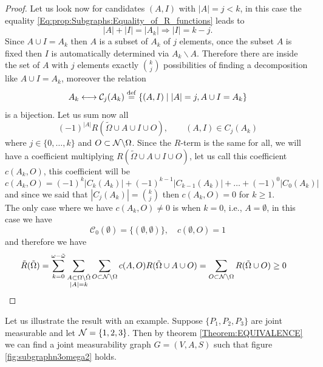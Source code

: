 \documentclass[10pt, a4paper]{amsart}
\begin{document}
\begin{proof}
Let us look now for candidates $(A,I)$ with $|A| = j< k$, in this case the equality \ref{Eq:prop:Subgraphs:Equality_of_R_functions} leads to 
$$
|A| + |I| = |A_{k}| \Rightarrow |I | = k-j.
$$ 
Since $A \cup I = A_{k}$ then $A$ is a subset of $A_{k}$ of $j$ elements, once the subset $A$ is fixed then $I$ is automatically determined via $A_{k}\backslash A $. Therefore there are inside the set of $A$ with $j$ elements exactly $\binom{k}{j}$ possibilities of finding a decomposition like $A\cup I = A_{k}$, moreover the relation 
$$
A_{k}\longleftrightarrow \mathcal{C}_{j}(A_{k})\overset{\mathrm{def}}{=} \{ (A,I) \mid |A|= j, A\cup I = A_{k}  \}
$$
is a bijection. Let us sum now all 
$$(-1)^{|A|}
R(
\tilde{\Omega}
\cup A\cup I \cup O
 ), \qquad (A,I) \in C_{j}(A_{k})
 $$
 where $ j\in \{0, \ldots, k\} $ and $ O \subset \mathcal{N}\backslash \Omega $. Since the $R$-term is the same for all, we will have a coefficient multiplying $R(
\tilde{\Omega}
\cup A\cup I \cup O
 )$, let us call this coefficient $c(A_{k},O)$, this coefficient will be 
 $$
c(A_{k},O ) = (-1)^{k}|C_{k}(A_{k})| + (-1)^{k-1} |C_{k-1}(A_{k})|+ \ldots + (-1)^{0}|C_{0}(A_{k})|
 $$ 
 and since we said that $|C_{j}(A_{k}) | = \binom{k}{j}$ then $c(A_{k},O) = 0$ for $k\geq 1$. \\
 
 The only case where we have $c(A_{k}, O) \neq 0$ is when $k=0$, i.e., $A = \emptyset$, in this case we have 
 $$
\mathcal{C}_{0}(\emptyset) =  \{(\emptyset,\emptyset) \}, \quad c(\emptyset,O ) =1
 $$
 and therefore we have 
 \begin{align*}
 \tilde{R}(\tilde{\Omega})
 &=
 \sum_{k=0}^{\omega - \tilde{\omega}}
 \sum_{\substack{
A\subset \Omega\backslash \tilde{\Omega}\\
|A| = k 
 }}
 \sum_{O\subset \mathcal{N}\backslash \Omega}
 c(A,O)
 R(\tilde{\Omega}\cup A \cup O)
 = 
\sum_{O\subset \mathcal{N}\backslash \Omega}
R(\tilde{\Omega}\cup O)\geq 0
 \end{align*}

\end{proof}
%


Let us illustrate the result with an example. Suppose $\{P_{1}, P_{2}, P_{3}\}$ are joint measurable and let $\mathcal{N} = \{1,2,3\}$. Then by theorem \ref{Theorem:EQUIVALENCE} we can find a joint measurability graph $G = (V,A,S)$ such that figure \ref{fig:subgraphn3omega2} holds. \\

\end{document}
